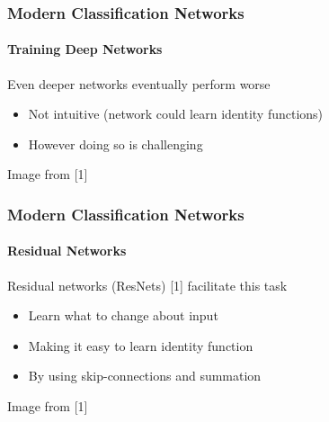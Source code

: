 \documentclass[xetex,professionalfont]{beamer}
\renewcommand\emph[1]{\textcolor{tuwcvl_cvl_blue}{#1}}
\begin{document}
\begin{frame}
	\frametitle{Modern Classification Networks}
	\framesubtitle{Training Deep Networks}

	Even deeper networks eventually perform worse
	\begin{itemize}
		\item Not intuitive (network could learn identity functions) %
		\item However doing so is challenging
	\end{itemize}

	\bigskip

	\begin{center}
		{\centering Image from [1]} %
	\end{center}

\end{frame}


\begin{frame}
	\frametitle{Modern Classification Networks}
	\framesubtitle{Residual Networks}

	\emph{Residual networks} (\emph{ResNets}) [1] facilitate this task
	\begin{itemize}
		\item Learn what to change about input
		\item Making it easy to learn identity function %
		\item By using \emph{skip-connections} and summation
	\end{itemize}

	\medskip

	\begin{center}
		{\centering Image from [1]}
	\end{center}

\end{frame}
\end{document}
